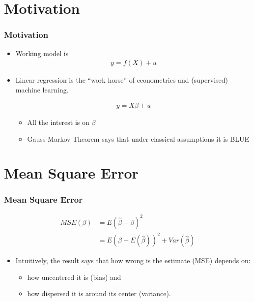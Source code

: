 \documentclass[
  shownotes,
  xcolor={svgnames},
  hyperref={colorlinks,citecolor=DarkBlue,linkcolor=DarkRed,urlcolor=DarkBlue}
  ]{beamer}
\begin{document}
\section{Motivation}
\begin{frame}
\frametitle{Motivation}

\begin{itemize}
  \item Working model is
  \begin{align}
  y=f(X)+u
  \end{align}
  \bigskip
  \item Linear regression is the “work horse” of econometrics and (supervised) machine learning. 
  
  \begin{align}
  y=X\beta+u
  \end{align}
  
  
  \begin{itemize}
    \item All the interest is on $\beta$
    \item Gauss-Markov Theorem says that under classical assumptions it is BLUE 
  \end{itemize}
  
\end{itemize}
\end{frame}




\section{Mean Square Error}

\begin{frame}
\frametitle{Mean Square Error}


\begin{align}
  MSE(\beta) &= E(\hat \beta - \beta)^2 \\
             &= E(\beta - E(\hat \beta))^2 + Var(\hat \beta) 
\end{align}

\begin{itemize}
\item  Intuitively, the result says that how wrong is the estimate (MSE) depends on: 
\bigskip
  \begin{itemize}
  \item how uncentered it is (bias) and 
  \item how dispersed it is around its center (variance). 
  \end{itemize}
\end{itemize}



\end{frame}
\end{document}
